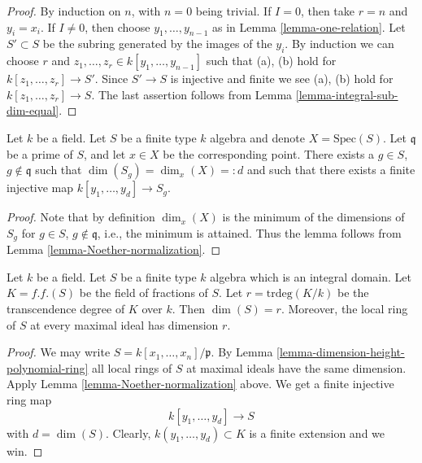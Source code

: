 \begin{proof}
By induction on $n$, with $n = 0$ being trivial.
If $I = 0$, then take $r = n$ and $y_i = x_i$.
If $I \not = 0$, then choose $y_1,\ldots, y_{n-1}$
as in Lemma \ref{lemma-one-relation}. Let
$S' \subset S$ be the subring generated by
the images of the $y_i$. By induction we can
choose $r$ and $z_1,\ldots, z_r \in k[y_1,\ldots,y_{n-1}]$
such that (a), (b) hold for $k[z_1,\ldots,z_r]
\to S'$. Since $S' \to S$ is injective and finite
we see (a), (b) hold for $k[z_1,\ldots,z_r]
\to S$. The last assertion follows from Lemma
\ref{lemma-integral-sub-dim-equal}.
\end{proof}

\begin{lemma}
\label{lemma-Noether-normalization-at-point}
Let $k$ be a field.
Let $S$ be a finite type $k$ algebra and denote $X = \text{Spec}(S)$.
Let $\mathfrak q$ be a prime of $S$, and let $x \in X$ be the
corresponding point. There exists a $g \in S$, $g \not \in \mathfrak q$
such that $\dim(S_g) = \dim_x(X) =: d$ and such that
there exists a finite injective map $k[y_1, \ldots, y_d] \to S_g$.
\end{lemma}

\begin{proof}
Note that by definition $\dim_x(X)$ is the minimum
of the dimensions of $S_g$ for $g \in S$, $g \not \in \mathfrak q$, i.e.,
the minimum is attained. Thus the lemma follows from
Lemma \ref{lemma-Noether-normalization}.
\end{proof}

\begin{lemma}
\label{lemma-dimension-prime-polynomial-ring}
Let $k$ be a field.
Let $S$ be a finite type $k$ algebra which is an integral domain.
Let $K = f.f.(S)$ be the field of fractions of $S$.
Let $r = \text{trdeg}(K/k)$ be the transcendence degree of $K$ over $k$.
Then $\dim(S) = r$. Moreover, the local ring of $S$ at every maximal
ideal has dimension $r$.
\end{lemma}

\begin{proof}
We may write $S = k[x_1, \ldots, x_n]/\mathfrak p$.
By Lemma \ref{lemma-dimension-height-polynomial-ring}
all local rings of $S$ at maximal ideals have the same dimension.
Apply Lemma \ref{lemma-Noether-normalization} above.
We get a finite injective ring map
$$
k[y_1, \ldots, y_d] \to S
$$
with $d = \dim(S)$. Clearly, $k(y_1, \ldots, y_d) \subset K$
is a finite extension and we win.
\end{proof}

